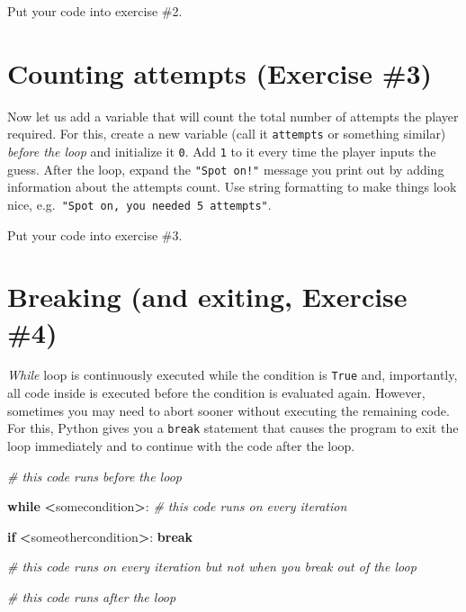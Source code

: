 \documentclass[
]{book}
\newenvironment{Shaded}{\begin{snugshade}}{\end{snugshade}}
\newcommand{\CommentTok}[1]{\textcolor[rgb]{0.56,0.35,0.01}{\textit{#1}}}
\newcommand{\ControlFlowTok}[1]{\textcolor[rgb]{0.13,0.29,0.53}{\textbf{#1}}}
\newcommand{\NormalTok}[1]{#1}
\newcommand{\OperatorTok}[1]{\textcolor[rgb]{0.81,0.36,0.00}{\textbf{#1}}}
\begin{document}
Put your code into exercise \#2.

\hypertarget{counting-attempts-exercise-3}{%
\section{Counting attempts (Exercise \#3)}\label{counting-attempts-exercise-3}}

Now let us add a variable that will count the total number of attempts the player required. For this, create a new variable (call it \texttt{attempts} or something similar) \emph{before the loop} and initialize it \texttt{0}. Add \texttt{1} to it every time the player inputs the guess. After the loop, expand the \texttt{"Spot\ on!"} message you print out by adding information about the attempts count. Use string formatting to make things look nice, e.g.~\texttt{"Spot\ on,\ you\ needed\ 5\ attempts"}.

Put your code into exercise \#3.

\hypertarget{breaking-and-exiting-exercise-4}{%
\section{Breaking (and exiting, Exercise \#4)}\label{breaking-and-exiting-exercise-4}}

\emph{While} loop is continuously executed while the condition is \texttt{True} and, importantly, all code inside is executed before the condition is evaluated again. However, sometimes you may need to abort sooner without executing the remaining code. For this, Python gives you a \texttt{break} statement that causes the program to exit the loop immediately and to continue with the code after the loop.

\begin{Shaded}
\begin{Highlighting}[]
\CommentTok{\# this code runs before the loop}

\ControlFlowTok{while} \OperatorTok{\textless{}}\NormalTok{somecondition}\OperatorTok{\textgreater{}}\NormalTok{:}
  \CommentTok{\# this code runs on every iteration}
  
    \ControlFlowTok{if} \OperatorTok{\textless{}}\NormalTok{someothercondition}\OperatorTok{\textgreater{}}\NormalTok{:}
        \ControlFlowTok{break}
  
  \CommentTok{\# this code runs on every iteration but not when you break out of the loop}

\CommentTok{\# this code runs after the loop}
\end{Highlighting}
\end{Shaded}
\end{document}
